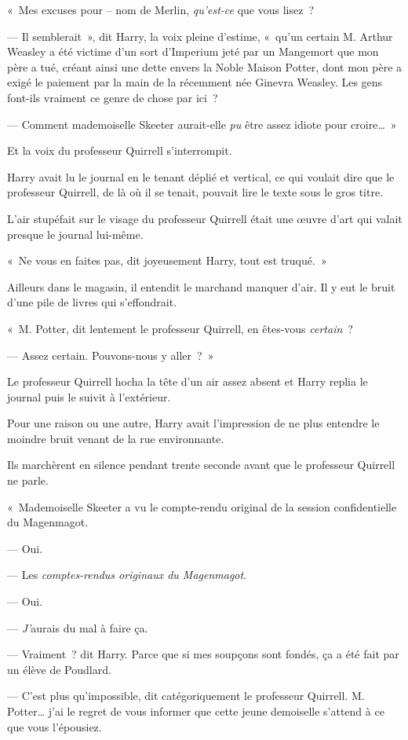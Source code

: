 «~Mes excuses pour -- nom de Merlin, \emph{qu'est-ce} que vous lisez~?

--- Il semblerait~», dit Harry, la voix pleine d'estime, «~qu'un certain M. Arthur Weasley a été victime d'un sort d'Imperium jeté par un Mangemort que mon père a tué, créant ainsi une dette envers la Noble Maison Potter, dont mon père a exigé le paiement par la main de la récemment née Ginevra Weasley. Les gens font-ils vraiment ce genre de chose par ici~?

--- Comment mademoiselle Skeeter aurait-elle \emph{pu} être assez idiote pour croire…~»

Et la voix du professeur Quirrell s'interrompit.

Harry avait lu le journal en le tenant déplié et vertical, ce qui voulait dire que le professeur Quirrell, de là où il se tenait, pouvait lire le texte sous le gros titre.

L'air stupéfait sur le visage du professeur Quirrell était une œuvre d'art qui valait presque le journal lui-même.

«~Ne vous en faites pas, dit joyeusement Harry, tout est truqué.~»

Ailleurs dans le magasin, il entendit le marchand manquer d'air. Il y eut le bruit d'une pile de livres qui s'effondrait.

«~M. Potter, dit lentement le professeur Quirrell, en êtes-vous \emph{certain}~?

--- Assez certain. Pouvons-nous y aller~?~»

Le professeur Quirrell hocha la tête d'un air assez absent et Harry replia le journal puis le suivit à l'extérieur.

Pour une raison ou une autre, Harry avait l'impression de ne plus entendre le moindre bruit venant de la rue environnante.

Ils marchèrent en silence pendant trente seconde avant que le professeur Quirrell ne parle.

«~Mademoiselle Skeeter a vu le compte-rendu original de la session confidentielle du Magenmagot.

--- Oui.

--- Les \emph{comptes-rendus originaux du Magenmagot}.

--- Oui.

--- \emph{J'}aurais du mal à faire ça.

--- Vraiment~? dit Harry. Parce que si mes soupçons sont fondés, ça a été fait par un élève de Poudlard.

--- C'est plus qu'impossible, dit catégoriquement le professeur Quirrell. M. Potter… j'ai le regret de vous informer que cette jeune demoiselle s'attend à ce que vous l'épousiez.


